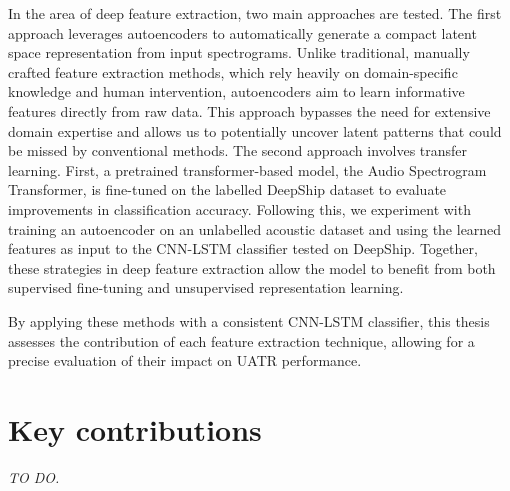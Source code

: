 In the area of deep feature extraction, two main approaches are tested. The first approach leverages autoencoders to automatically generate a compact latent space representation from input spectrograms. Unlike traditional, manually crafted feature extraction methods, which rely heavily on domain-specific knowledge and human intervention, autoencoders aim to learn informative features directly from raw data. This approach bypasses the need for extensive domain expertise and allows us to potentially uncover latent patterns that could be missed by conventional methods. The second approach involves transfer learning. First, a pretrained transformer-based model, the Audio Spectrogram Transformer, is fine-tuned on the labelled DeepShip dataset to evaluate improvements in classification accuracy. Following this, we experiment with training an autoencoder on an unlabelled acoustic dataset and using the learned features as input to the CNN-LSTM classifier tested on DeepShip. Together, these strategies in deep feature extraction allow the model to benefit from both supervised fine-tuning and unsupervised representation learning.

By applying these methods with a consistent CNN-LSTM classifier, this thesis assesses the contribution of each feature extraction technique, allowing for a precise evaluation of their impact on UATR performance.

\section{Key contributions}

\textit{TO DO.}




